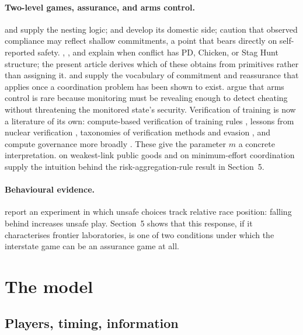 \documentclass[11pt]{article}
\theoremstyle{plain}
\theoremstyle{definition}
\theoremstyle{remark}
\begin{document}
\paragraph{Two-level games, assurance, and arms control.} \citet{putnam1988} and \citet{tsebelis1990} supply the nesting logic; \citet{evans1993} and \citet{milner1997} develop its domestic side; \citet{downs1996} caution that observed compliance may reflect shallow commitments, a point that bears directly on self-reported safety. \citet{jervis1978}, \citet{snyder1971}, and \citet{glaser1997} explain when conflict has PD, Chicken, or Stag Hunt structure; the present article derives which of these obtains from primitives rather than assigning it. \citet{schelling1960,schelling1966} and \citet{kydd2000,kydd2005} supply the vocabulary of commitment and reassurance that applies once a coordination problem has been shown to exist. \citet{coe2020} argue that arms control is rare because monitoring must be revealing enough to detect cheating without threatening the monitored state's security. Verification of training is now a literature of its own: compute-based verification of training rules \citep{shavit2023}, lessons from nuclear verification \citep{baker2023}, taxonomies of verification methods and evasion \citep{wasil2024,scher2024}, and compute governance more broadly \citep{sastry2024,brundage2020}. These give the parameter $m$ a concrete interpretation. \citet{hirshleifer1983} on weakest-link public goods and \citet{vanhuyck1990} on minimum-effort coordination supply the intuition behind the risk-aggregation-rule result in Section~5.

\paragraph{Behavioural evidence.} \citet{fernandez2026} report an experiment in which unsafe choices track relative race position: falling behind increases unsafe play. Section~5 shows that this response, if it characterises frontier laboratories, is one of two conditions under which the interstate game can be an assurance game at all.

\section{The model}

\subsection{Players, timing, information}
\end{document}
